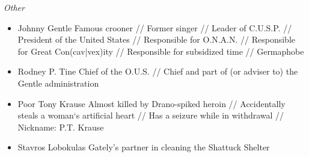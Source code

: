 \documentclass{article}
\begin{document}
\begin{tcolorbox}[height=26cm]
\large\emph{Other}
\small
\begin{itemize}
\item  \small{Johnny Gentle}\newline
\scriptsize{Famous crooner // Former singer // Leader of C.U.S.P. // President of the United States // Responsible for O.N.A.N. // Responsible for Great Con(cav|vex)ity // Responsible for subsidized time // Germaphobe
}
\item  \small{Rodney P. Tine}\newline
\scriptsize{Chief of the O.U.S. // Chief and part of (or adviser to) the Gentle administration}
\item  \small{Poor Tony Krause}\newline
\scriptsize{Almost killed by Drano-spiked heroin // Accidentally steals a woman`s artificial heart // Has a seizure while in withdrawal // Nickname: P.T. Krause}
\item  \small{Stavros Lobokulas}\newline
\scriptsize{Gately's partner in cleaning the Shattuck Shelter}
\end{itemize}





\end{tcolorbox}
\end{document}
